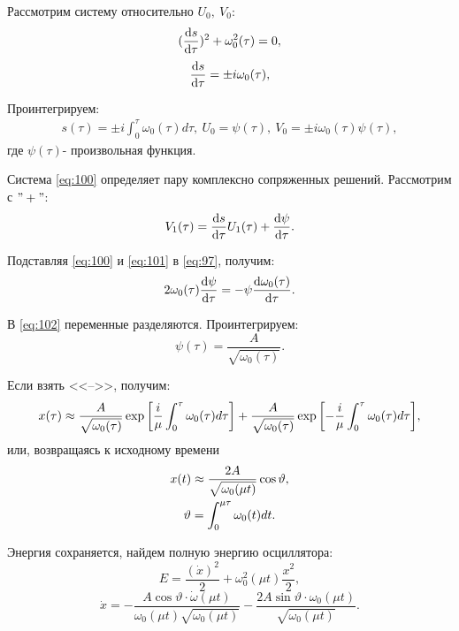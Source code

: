 Рассмотрим систему относительно $U_0,~V_0$:
\begin{equation}
	(\dv{s}{\tau})^2+\omega^2_0(\tau)=0,
	\label{eq:98}	
\end{equation}
\begin{equation}
	\dv{s}{\tau}=\pm i\omega_0(\tau),
	\label{eq:99}	
\end{equation}

Проинтегрируем:
\begin{gather}
	s(\tau)=\pm i \int_0^{\tau}\omega_0(\tau)d \tau, ~U_0=\psi(\tau), ~V_0=\pm i \omega_0(\tau)\psi(\tau), 
	\label{eq:100}
\end{gather}
где $\psi(\tau)$- произвольная функция.

Система \eqref{eq:100} определяет пару комплексно сопряженных решений. Рассмотрим с $"+"$:
\begin{equation}
	V_1(\tau)=\dv{s}{\tau}U_1(\tau)+\dv{\psi}{\tau}.
	\label{eq:101}	
\end{equation}

Подставляя \eqref{eq:100} и \eqref{eq:101} в \eqref{eq:97}, получим:
\begin{equation}
	2\omega_0(\tau)\dv{\psi}{\tau}=-\psi\dv{\omega_0(\tau)}{\tau}.
	\label{eq:102}	
\end{equation}

В \eqref{eq:102} переменные разделяются. Проинтегрируем:
\begin{equation*}
	\psi(\tau)=\frac{A}{\sqrt{\omega_0(\tau)}}.
\end{equation*}

Если взять <<-->>, получим:
\begin{equation*}
	x(\tau) \approx \frac{A}{\sqrt{\omega_0(\tau)}} \exp \qty[\frac{i}{\mu}\int_0^{\tau}\omega_0(\tau)d \tau]+\frac{A}{\sqrt{\omega_0(\tau)}} \exp \qty[-\frac{i}{\mu}\int_0^{\tau}\omega_0(\tau)d \tau],
\end{equation*}
или, возвращаясь к исходному времени
\begin{gather}
	x(t) \approx \frac{2A}{\sqrt{\omega_0(\mu t)}}\cos\vartheta, \\
	\label{eq:103}
	\vartheta=\int_0^{\mu \tau}\omega_0(t)dt. \notag	
\end{gather}

Энергия сохраняется, найдем полную энергию осциллятора:
\begin{equation}
	E=\frac{(\dot x)^2}{2}+\omega_0^2(\mu t)\frac{x^2}{2}, 
	\label{eq:104}
\end{equation}
\begin{equation}
	\dot{x}=-\frac{A\cos\vartheta \cdot \dot{\omega}(\mu t)}{\omega_0(\mu t)\sqrt{\omega_0(\mu t)}}-\frac{2A\sin\vartheta \cdot \omega_0(\mu t)}{\sqrt{\omega_0(\mu t)}}.
	\label{eq:105}	
\end{equation}

